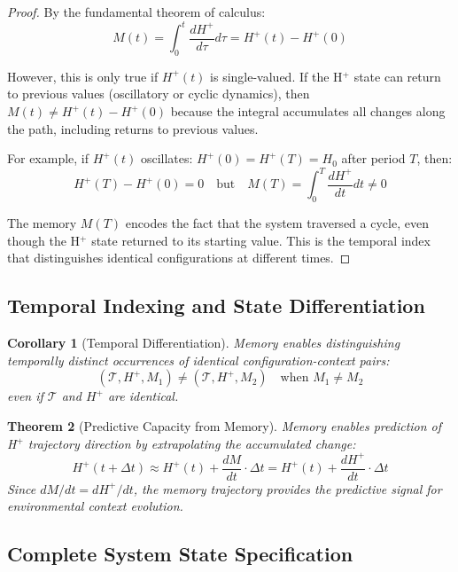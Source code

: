 \documentclass[aps,prd,twocolumn,superscriptaddress,floatfix,nofootinbib]{revtex4-2}
\newtheorem{theorem}{Theorem}[section]
\newtheorem{corollary}[theorem]{Corollary}
\theoremstyle{remark}
\begin{document}
\begin{proof}
By the fundamental theorem of calculus:
$$
M(t) = \int_0^t \frac{dH^+}{d\tau} d\tau = H^+(t) - H^+(0)
$$

However, this is only true if $H^+(t)$ is single-valued. If the H$^+$ state can return to previous values (oscillatory or cyclic dynamics), then $M(t) \neq H^+(t) - H^+(0)$ because the integral accumulates all changes along the path, including returns to previous values.

For example, if $H^+(t)$ oscillates: $H^+(0) = H^+(T) = H_0$ after period $T$, then:
$$
H^+(T) - H^+(0) = 0 \quad \text{but} \quad M(T) = \int_0^T \frac{dH^+}{dt} dt \neq 0
$$

The memory $M(T)$ encodes the fact that the system traversed a cycle, even though the H$^+$ state returned to its starting value. This is the temporal index that distinguishes identical configurations at different times.
\end{proof}

\subsection{Temporal Indexing and State Differentiation}

\begin{corollary}[Temporal Differentiation]
\label{cor:temporal_diff}
Memory enables distinguishing temporally distinct occurrences of identical configuration-context pairs:
\begin{equation}
(\mathcal{T}, H^+, M_1) \neq (\mathcal{T}, H^+, M_2) \quad \text{when } M_1 \neq M_2
\end{equation}
even if $\mathcal{T}$ and $H^+$ are identical.
\end{corollary}

\begin{theorem}[Predictive Capacity from Memory]
\label{thm:prediction}
Memory enables prediction of H$^+$ trajectory direction by extrapolating the accumulated change:
\begin{equation}
H^+(t + \Delta t) \approx H^+(t) + \frac{dM}{dt} \cdot \Delta t = H^+(t) + \frac{dH^+}{dt} \cdot \Delta t
\end{equation}
Since $dM/dt = dH^+/dt$, the memory trajectory provides the predictive signal for environmental context evolution.
\end{theorem}

\subsection{Complete System State Specification}
\end{document}

